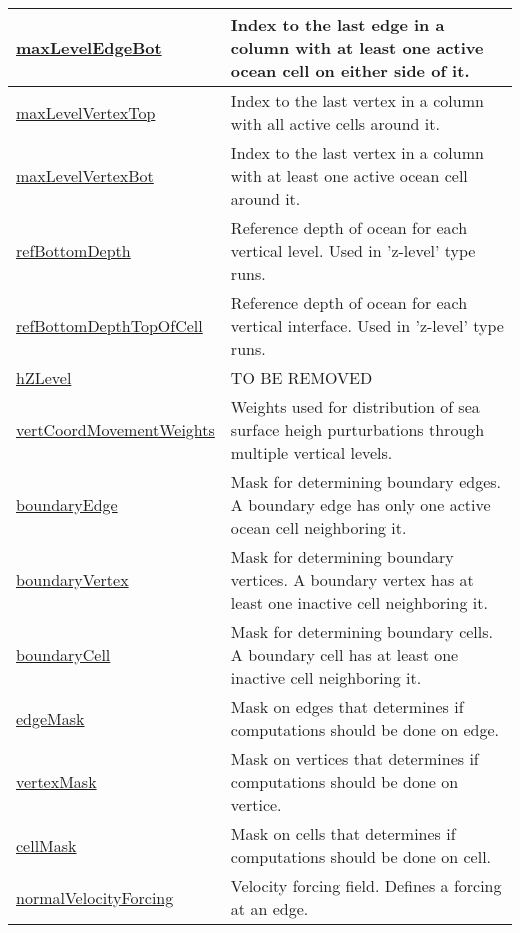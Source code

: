 {\begin{center}
\begin{longtable}{| p{2.0in} | p{4.0in} |}
	\hline
	\hyperref[subsec:var_sec_mesh_maxLevelEdgeBot]{maxLevelEdgeBot} & Index to the last edge in a column with at least one active ocean cell on either side of it. \\
	\hline
	\hyperref[subsec:var_sec_mesh_maxLevelVertexTop]{maxLevelVertexTop} & Index to the last vertex in a column with all active cells around it. \\
	\hline
	\hyperref[subsec:var_sec_mesh_maxLevelVertexBot]{maxLevelVertexBot} & Index to the last vertex in a column with at least one active ocean cell around it. \\
	\hline
	\hyperref[subsec:var_sec_mesh_refBottomDepth]{refBottomDepth} & Reference depth of ocean for each vertical level. Used in 'z-level' type runs. \\
	\hline
	\hyperref[subsec:var_sec_mesh_refBottomDepthTopOfCell]{refBottomDepthTopOfCell} & Reference depth of ocean for each vertical interface. Used in 'z-level' type runs. \\
	\hline
	\hyperref[subsec:var_sec_mesh_hZLevel]{hZLevel} & {\color{red} TO BE REMOVED} \\
	\hline
	\hyperref[subsec:var_sec_mesh_vertCoordMovementWeights]{vertCoordMovementWeights} & Weights used for distribution of sea surface heigh purturbations through multiple vertical levels. \\
	\hline
	\hyperref[subsec:var_sec_mesh_boundaryEdge]{boundaryEdge} & Mask for determining boundary edges. A boundary edge has only one active ocean cell neighboring it. \\
	\hline
	\hyperref[subsec:var_sec_mesh_boundaryVertex]{boundaryVertex} & Mask for determining boundary vertices. A boundary vertex has at least one inactive cell neighboring it. \\
	\hline
	\hyperref[subsec:var_sec_mesh_boundaryCell]{boundaryCell} & Mask for determining boundary cells. A boundary cell has at least one inactive cell neighboring it. \\
	\hline
	\hyperref[subsec:var_sec_mesh_edgeMask]{edgeMask} & Mask on edges that determines if computations should be done on edge. \\
	\hline
	\hyperref[subsec:var_sec_mesh_vertexMask]{vertexMask} & Mask on vertices that determines if computations should be done on vertice. \\
	\hline
	\hyperref[subsec:var_sec_mesh_cellMask]{cellMask} & Mask on cells that determines if computations should be done on cell. \\
	\hline
	\hyperref[subsec:var_sec_mesh_normalVelocityForcing]{normalVelocityForcing} & Velocity forcing field. Defines a forcing at an edge. \\

\end{longtable}
\end{center}}

